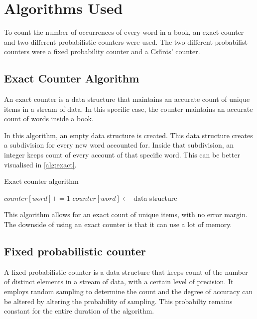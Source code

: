 \section{Algorithms Used}\label{section:algorithms-used}
To count the number of occurrences of every word in a book, an exact counter and two different probabilistic counters were used.
The two different probabilist counters were a fixed probability counter and a Csűrös' counter.

\subsection{Exact Counter Algorithm}
An exact counter is a data structure that maintains an accurate count of unique items in a stream of data.
In this specific case, the counter maintains an accurate count of words inside a book. 

In this algorithm, an empty data structure is created.
This data structure creates a subdivision for every new word accounted for.
Inside that subdivision, an integer keeps count of every account of that specific word.
This can be better visualised in \autoref{alg:exact}.

\begin{algorithm}
\caption{Exact counter algorithm}
\label{alg:exact}
\begin{algorithmic}


        \State $counter[word]+=1$
    \Else
        \State $counter[word] \gets$ data structure
    \EndIf
\EndFor
\end{algorithmic}
\end{algorithm}


This algorithm allows for an exact count of unique items, with no error margin. 
The downside of using an exact counter is that it can use a lot of memory.

\subsection{Fixed probabilistic counter}
A fixed probabilistic counter is a data structure that keeps count of the number of distinct elements in a stream of data, with a certain level of precision. 
It employs random sampling to determine the count and the degree of accuracy can be altered by altering the probability of sampling.
This probabilty remains constant for the entire duration of the algorithm.

